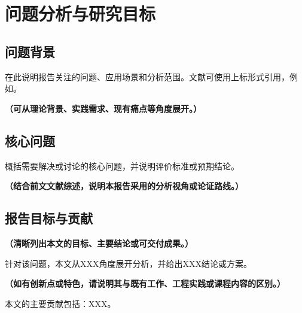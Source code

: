 \section{问题分析与研究目标}

\subsection{问题背景}
在此说明报告关注的问题、应用场景和分析范围。文献可使用上标形式引用，例如。

\textbf{\color{red}（可从理论背景、实践需求、现有痛点等角度展开。）}

\subsection{核心问题}
概括需要解决或讨论的核心问题，并说明评价标准或预期结论。

\textbf{\color{red}（结合前文文献综述，说明本报告采用的分析视角或论证路线。）}

\subsection{报告目标与贡献}
\textbf{\color{red}（清晰列出本文的目标、主要结论或可交付成果。）}

针对该问题，本文从XXX角度展开分析，并给出XXX结论或方案。

\textbf{\color{red}（如有创新点或特色，请说明其与既有工作、工程实践或课程内容的区别。）}

本文的主要贡献包括：XXX。
